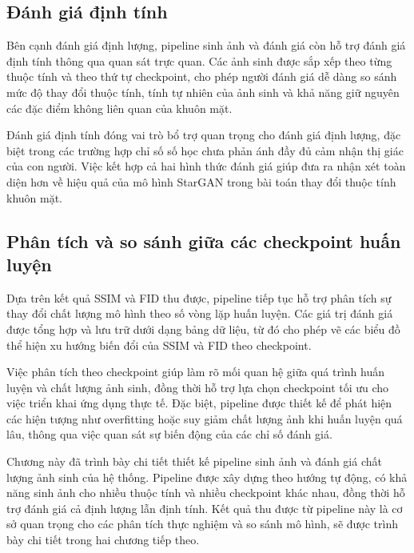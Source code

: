 \documentclass[../DoAn.tex]{subfiles}
\begin{document}
\subsection{Đánh giá định tính}

Bên cạnh đánh giá định lượng, pipeline sinh ảnh và đánh giá còn hỗ trợ đánh giá định tính thông qua quan sát trực quan. Các ảnh sinh được sắp xếp theo từng thuộc tính và theo thứ tự checkpoint, cho phép người đánh giá dễ dàng so sánh mức độ thay đổi thuộc tính, tính tự nhiên của ảnh sinh và khả năng giữ nguyên các đặc điểm không liên quan của khuôn mặt.

Đánh giá định tính đóng vai trò bổ trợ quan trọng cho đánh giá định lượng, đặc biệt trong các trường hợp chỉ số số học chưa phản ánh đầy đủ cảm nhận thị giác của con người. Việc kết hợp cả hai hình thức đánh giá giúp đưa ra nhận xét toàn diện hơn về hiệu quả của mô hình StarGAN trong bài toán thay đổi thuộc tính khuôn mặt.

\subsection{Phân tích và so sánh giữa các checkpoint huấn luyện}

Dựa trên kết quả SSIM và FID thu được, pipeline tiếp tục hỗ trợ phân tích sự thay đổi chất lượng mô hình theo số vòng lặp huấn luyện. Các giá trị đánh giá được tổng hợp và lưu trữ dưới dạng bảng dữ liệu, từ đó cho phép vẽ các biểu đồ thể hiện xu hướng biến đổi của SSIM và FID theo checkpoint.

Việc phân tích theo checkpoint giúp làm rõ mối quan hệ giữa quá trình huấn luyện và chất lượng ảnh sinh, đồng thời hỗ trợ lựa chọn checkpoint tối ưu cho việc triển khai ứng dụng thực tế. Đặc biệt, pipeline được thiết kế để phát hiện các hiện tượng như overfitting hoặc suy giảm chất lượng ảnh khi huấn luyện quá lâu, thông qua việc quan sát sự biến động của các chỉ số đánh giá.



Chương này đã trình bày chi tiết thiết kế pipeline sinh ảnh và đánh giá chất lượng ảnh sinh của hệ thống. Pipeline được xây dựng theo hướng tự động, có khả năng sinh ảnh cho nhiều thuộc tính và nhiều checkpoint khác nhau, đồng thời hỗ trợ đánh giá cả định lượng lẫn định tính. Kết quả thu được từ pipeline này là cơ sở quan trọng cho các phân tích thực nghiệm và so sánh mô hình, sẽ được trình bày chi tiết trong hai chương tiếp theo.
\end{document}
